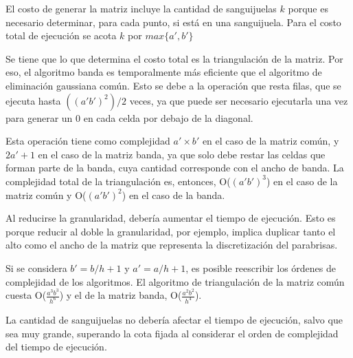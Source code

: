 \documentclass[a4paper]{article}
\begin{document}
El costo de generar la matriz incluye la cantidad de sanguijuelas $k$ porque es necesario determinar, para cada punto, si está en una sanguijuela. Para el costo total de ejecución se acota $k$ por $max\{a',b'\}$

Se tiene que lo que determina el costo total es la triangulación de la matriz. Por eso, el algoritmo banda es temporalmente más eficiente que el algoritmo de eliminación gaussiana común. Esto se debe a la operación que resta filas, que se ejecuta hasta $((a'b')^2)/2$ veces, ya que puede ser necesario ejecutarla una vez para generar un 0 en cada celda por debajo de la diagonal. 

Esta operación tiene como complejidad $a' \times b'$ en el caso de la matriz común, y $2a'+1$ en el caso de la matriz banda, ya que solo debe restar las celdas que forman parte de la banda, cuya cantidad corresponde con el ancho de banda. La complejidad total de la triangulación es, entonces, O($(a'b')^3$) en el caso de la matriz común y O($(a'b')^2$) en el caso de la banda. 

Al reducirse la granularidad, debería aumentar el tiempo de ejecución. Esto es porque reducir al doble la granularidad, por ejemplo, implica duplicar tanto el alto como el ancho de la matriz que representa la discretización del parabrisas.

Si se considera $b'=b/h+1$ y $a'=a/h+1$, es posible reescribir los órdenes de complejidad de los algoritmos. El algoritmo de triangulación de la matriz común cuesta O($\frac{a^3 b^3}{h^6}$) y el de la matriz banda, O($\frac{a^2 b^2}{h^4}$).

La cantidad de sanguijuelas no debería afectar el tiempo de ejecución, salvo que sea muy grande, superando la cota fijada al considerar el orden de complejidad del tiempo de ejecución. \newline
\end{document}
